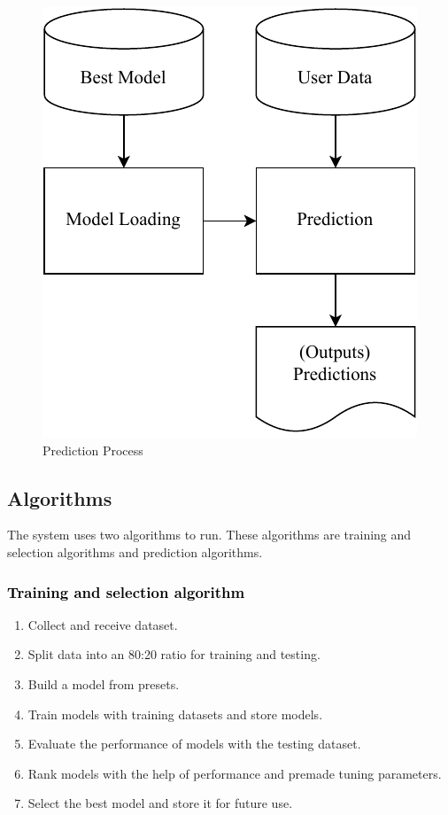 \documentclass[a4paper,fleqn]{cas-dc}
\newcommand{\responsemodsm}[1]{\textcolor{black}{#1}}
\newcommand{\subsubsectionb}[1]{\subsubsection{\responsemodsm{#1}}}
\begin{document}
\begin{figure}[ht]
    \centering
    \includegraphics[width=0.7\columnwidth]{prediction.pdf}
    \caption{Prediction Process}
    \label{fig:prediction_process}
\end{figure}

\subsection{Algorithms}\label{subsec:algorithms}

The system uses two algorithms to run. These algorithms are training and selection algorithms and prediction algorithms.

\vspace{-0.5em}

\subsubsectionb{Training and selection algorithm}\label{subsubsec:training_and_selection_algorithm}
\vspace{0.5em}
\begin{enumerate}
    \item Collect and receive dataset.
    \item Split data into an 80:20 ratio for training and testing.
    \item Build a model from presets.
    \item Train models with training datasets and store models.
    \item Evaluate the performance of models with the testing dataset.
    \item Rank models with the help of performance and premade tuning parameters.
    \item Select the best model and store it for future use.
\end{enumerate}
\end{document}
